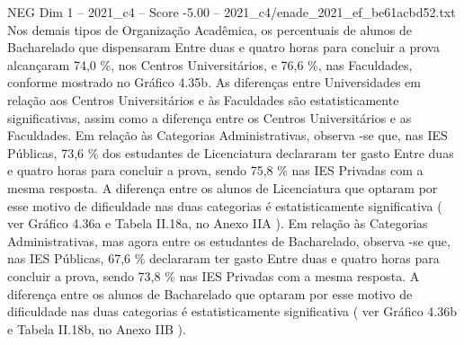 \begin{textsample}{NEG Dim 1 – 2021\_c4 – Score -5.00 – 2021\_c4/enade\_2021\_ef\_be61acbd52.txt}
Nos demais tipos de Organização Acadêmica, os percentuais de alunos de Bacharelado que dispensaram Entre duas e quatro horas para concluir a prova alcançaram 74,0 \%, nos Centros Universitários, e 76,6 \%, nas Faculdades, conforme mostrado no Gráfico 4.35b.
As diferenças entre Universidades em relação aos Centros Universitários e às Faculdades são estatisticamente significativas, assim como a diferença entre os Centros Universitários e as Faculdades.
Em relação às Categorias Administrativas, observa -se que, nas IES Públicas, 73,6 \% dos estudantes de Licenciatura declararam ter gasto Entre duas e quatro horas para concluir a prova, sendo 75,8 \% nas IES Privadas com a mesma resposta.
A diferença entre os alunos de Licenciatura que optaram por esse motivo de dificuldade nas duas categorias é estatisticamente significativa ( ver Gráfico 4.36a e Tabela II.18a, no Anexo IIA ).
Em relação às Categorias Administrativas, mas agora entre os estudantes de Bacharelado, observa -se que, nas IES Públicas, 67,6 \% declararam ter gasto Entre duas e quatro horas para concluir a prova, sendo 73,8 \% nas IES Privadas com a mesma resposta.
A diferença entre os alunos de Bacharelado que optaram por esse motivo de dificuldade nas duas categorias é estatisticamente significativa ( ver Gráfico 4.36b e Tabela II.18b, no Anexo IIB ).

\end{textsample}
